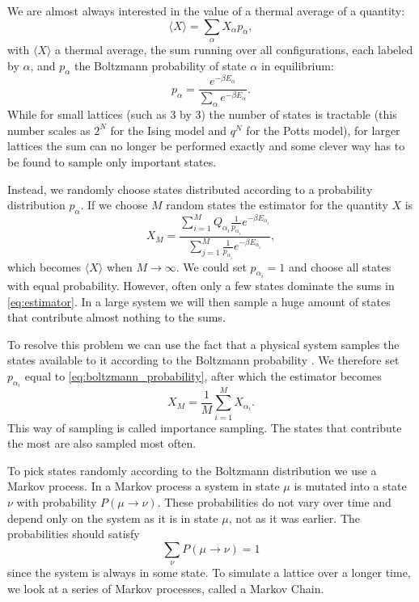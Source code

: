\documentclass[11pt, a4paper]{report} %
\begin{document}
We are almost always interested in the value of a thermal average of a quantity:
\begin{equation}
	\langle X \rangle = \sum_{\alpha}X_{\alpha}p_{\alpha},
\end{equation}
with \(\langle X \rangle\) a thermal average, the sum running over all configurations, each labeled by \(\alpha\), and \(p_{\alpha}\) the Boltzmann probability of state \(\alpha\) in equilibrium\cite{binney:1992}:
\begin{equation}\label{eq:boltzmann_probability}
	p_{\alpha} = \frac{e^{-\beta E_{\alpha}}}{\sum_{\alpha}e^{-\beta E_{\alpha}}}.
\end{equation}
While for small lattices (such as 3 by 3) the number of states is tractable (this number scales as \(2^{N}\) for the Ising model and \(q^{N}\) for the Potts model), for larger lattices the sum can no longer be performed exactly and some clever way has to be found to sample only important states.

Instead, we randomly choose states distributed according to a probability distribution \(p_{\alpha}\).
If we choose \(M\) random states the estimator for the quantity \(X\) is
\begin{equation}\label{eq:estimator}
	X_M = \frac{\sum_{i=1}^M Q_{\alpha_i}\frac{1}{p_{\alpha_i}}e^{-\beta E_{\alpha_i}}}{\sum_{j=1}^M \frac{1}{p_{\alpha_i}} e^{-\beta E_{\alpha_i}}},
\end{equation}
which becomes \(\langle X \rangle\) when \(M \to \infty\).
We could set \(p_{\alpha_i}=1\) and choose all states with equal probability.
However, often only a few states dominate the sums in \cref{eq:estimator}.
In a large system we will then sample a huge amount of states that contribute almost nothing to the sums.\cite{newman:1999}

To resolve this problem we can use the fact that a physical system samples the states available to it according to the Boltzmann probability .
We therefore set \(p_{\alpha_i}\) equal to \cref{eq:boltzmann_probability}, after which the estimator becomes
\begin{equation}
	X_M = \frac{1}{M} \sum_{i=1}^M X_{\alpha_i}.
\end{equation}
This way of sampling is called importance sampling. The states that contribute the most are also sampled most often.\cite{newman:1999}

To pick states randomly according to the Boltzmann distribution we use a Markov process.
In a Markov process a system in state \(\mu\) is mutated into a state \(\nu\) with probability \(P(\mu\to\nu)\).
These probabilities do not vary over time and depend only on the system as it is in state \(\mu\), not as it was earlier.
The probabilities should satisfy
\begin{equation}
	\sum_{\nu} P(\mu \to \nu) = 1
\end{equation}
since the system is always in some state.\cite{newman:1999,landau:2015}
To simulate a lattice over a longer time, we look at a series of Markov processes, called a Markov Chain.
\end{document}
